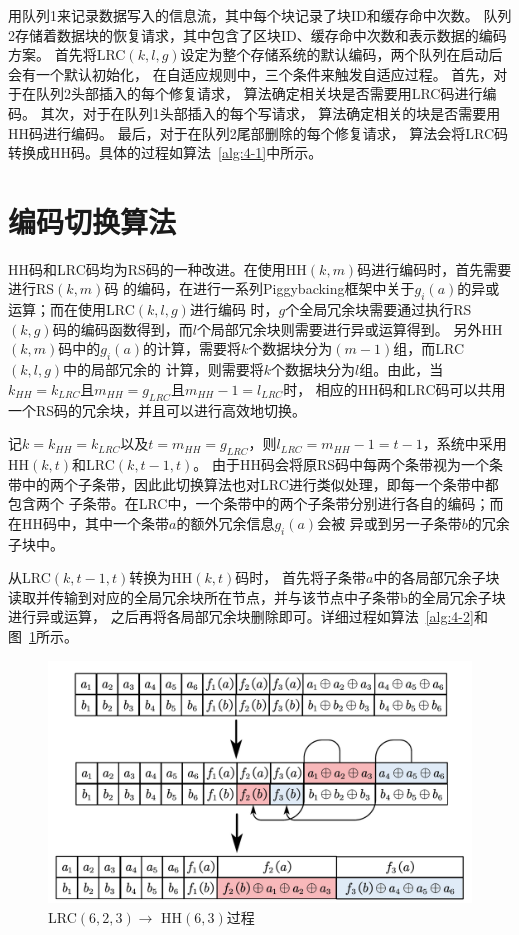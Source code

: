用队列1来记录数据写入的信息流，其中每个块记录了块ID和缓存命中次数。
队列2存储着数据块的恢复请求，其中包含了区块ID、缓存命中次数和表示数据的编码方案。
首先将LRC$(k, l,g)$设定为整个存储系统的默认编码，两个队列在启动后会有一个默认初始化，
在自适应规则中，三个条件来触发自适应过程。 首先，对于在队列2头部插入的每个修复请求，
算法确定相关块是否需要用LRC码进行编码。 其次，对于在队列1头部插入的每个写请求，
算法确定相关的块是否需要用HH码进行编码。 最后，对于在队列2尾部删除的每个修复请求，
算法会将LRC码转换成HH码。具体的过程如算法~\ref{alg:4-1}中所示。




\section{编码切换算法}

HH码和LRC码均为RS码的一种改进。在使用HH$(k,m)$码进行编码时，首先需要进行RS$(k,m)$码
的编码，在进行一系列Piggybacking框架中关于$g_i(a)$的异或运算；而在使用LRC$(k,l,g)$进行编码
时，$g$个全局冗余块需要通过执行RS$(k,g)$码的编码函数得到，而$l$个局部冗余块则需要进行异或运算得到。
另外HH$(k,m)$码中的$g_i(a)$的计算，需要将$k$个数据块分为$(m-1)$组，而LRC$(k,l,g)$中的局部冗余的
计算，则需要将$k$个数据块分为$l$组。由此，当$k_{HH}=k_{LRC}$且$m_{HH}=g_{LRC}$且$m_{HH}-1=l_{LRC}$时，
相应的HH码和LRC码可以共用一个RS码的冗余块，并且可以进行高效地切换。

记$k=k_{HH}=k_{LRC}$以及$t=m_{HH}=g_{LRC}$，则$l_{LRC}=m_{HH}-1=t-1$，系统中采用HH$(k,t)$和LRC$(k,t-1,t)$。
由于HH码会将原RS码中每两个条带视为一个条带中的两个子条带，因此此切换算法也对LRC进行类似处理，即每一个条带中都包含两个
子条带。在LRC中，一个条带中的两个子条带分别进行各自的编码；而在HH码中，其中一个条带$a$的额外冗余信息$g_i(a)$会被
异或到另一子条带$b$的冗余子块中。

从LRC$(k,t-1,t)$转换为HH$(k,t)$码时，
首先将子条带$a$中的各局部冗余子块读取并传输到对应的全局冗余块所在节点，并与该节点中子条带b的全局冗余子块进行异或运算，
之后再将各局部冗余块删除即可。详细过程如算法~\ref{alg:4-2}和图~\ref{fig:4.4}所示。

\begin{figure}[H]
	\centering
	\includegraphics [scale=0.5]{figures/4.4.pdf}
	\caption{LRC$(6,2,3)\rightarrow $ HH$(6,3)$过程}
	\label{fig:4.4}
\end{figure}


